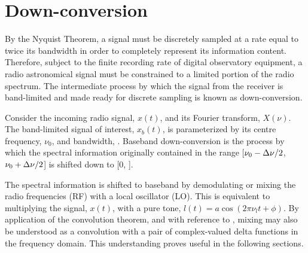\section{Down-conversion}
\label{app:downconversion}


By the Nyquist Theorem, a signal must be discretely sampled at a rate equal to twice its bandwidth in order to completely represent its information content.
%
Therefore, subject to the finite recording rate of
digital observatory equipment, a radio astronomical signal must be constrained to a limited portion of the radio spectrum.
%
The intermediate process by which the signal from the receiver is band-limited and made ready for discrete sampling is known as down-conversion.

Consider the incoming radio signal, $x(t)$, and its Fourier transform, $X(\nu)$.  The band-limited signal of interest, $x_b(t)$, is parameterized by its centre frequency, $\nu_0$, and bandwidth, \bw.  
%
Baseband down-conversion is the process by which the spectral information originally contained in the range [$\nu_0- \Delta\nu /2$, $\nu_0+ \Delta\nu /2$] is shifted down to [0, \bw]. 


The spectral information is shifted to baseband by demodulating or mixing the radio frequencies (RF) with a local oscillator (LO).  This is equivalent to multiplying the signal, $x(t)$, with a pure tone, $l(t)=a\cos(2\pi\nu_l t + \phi)$.  
%
By application of the convolution theorem, and with reference to , mixing may also be understood as a convolution with a pair of complex-valued delta
functions in the frequency domain.  This understanding proves useful in the following sections.

